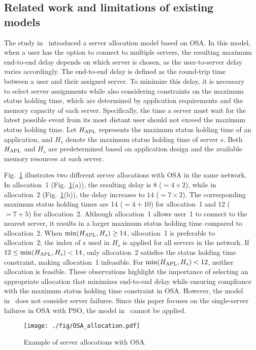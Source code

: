 \documentclass[10pt, letterpaper]{IEEEtran}
\begin{document}
\begin{CJK}{UTF8}{ipxm}
\section{Related work and limitations of existing models}
\label{sec:related_work}

The study in~\cite{OSA_Kawabata_2021} introduced a server allocation model based on OSA. 
In this model, when a user has the option to connect to multiple servers, the resulting maximum end-to-end delay depends on which server is chosen, as the user-to-server delay varies accordingly. 
The end-to-end delay is defined as the round-trip time between a user and their assigned server. 
To minimize this delay, it is necessary to select server assignments while also considering constraints on the maximum status holding time, which are determined by application requirements and the memory capacity of each server. 
Specifically, the time a server must wait for the latest possible event from its most distant user should not exceed the maximum status holding time. 
Let $H_{\rm APL}$ represents the maximum status holding time of an application, and $H_s$ denote the maximum status holding time of server $s$. 
Both $H_{\rm APL}$ and $H_s$ are predetermined based on application design and the available memory resources at each server.

Fig.~\ref{fig:OSA_allocation} illustrates two different server allocations with OSA in the same network. 
In allocation~1 (Fig.~\ref{fig:OSA_allocation}(a)), the resulting delay is $8$ ($=4 \times 2$), while in allocation~2 (Fig.~\ref{fig:OSA_allocation}(b)), the delay increases to $14$ ($=7 \times 2$). 
The corresponding maximum status holding times are $14$ ($=4+10$) for allocation~1 and $12$ ($=7+5$) for allocation~2. 
Although allocation~1 allows user~1 to connect to the nearest server, it results in a larger maximum status holding time compared to allocation~2. 
When $\min(H_{\rm APL}, H_s) \geq 14$, allocation~1 is preferable to allocation~2; the index of $s$ used in $H_s$ is applied for all servers in the network.
If $12 \leq \min(H_{\rm APL}, H_s) < 14$, only allocation~2 satisfies the status holding time constraint, making allocation~1 infeasible. 
For $\min(H_{\rm APL}, H_s) < 12$, neither allocation is feasible. 
These observations highlight the importance of selecting an appropriate allocation that minimizes end-to-end delay while ensuring compliance with the maximum status holding time constraint in OSA.
However, the model in~\cite{OSA_Kawabata_2021} does not consider server failures.
Since this paper focuses on the single-server failures in OSA with PSO, the model in~\cite{OSA_Kawabata_2021} cannot be applied.
\begin{figure}[tb]
  \begin{center}
      \texttt{[image: ./fig/OSA\_allocation.pdf]}
  \end{center}
  \caption{Example of server allocations with OSA.}
  \label{fig:OSA_allocation}
\end{figure}


\end{CJK}
\end{document}
